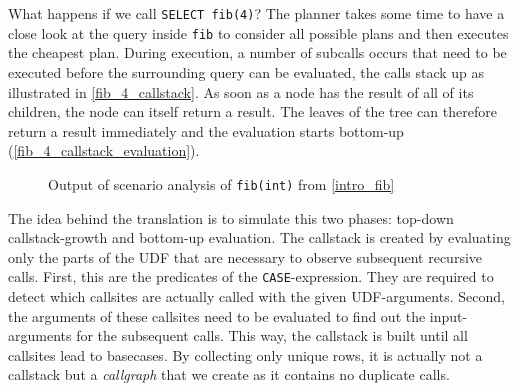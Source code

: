 What happens if we call \texttt{SELECT fib(4)}? The planner takes some time to have a close look at the query inside \texttt{fib} to consider all possible plans and then executes the cheapest plan. During execution, a number of subcalls occurs that need to be executed before the surrounding query can be evaluated, the calls stack up as illustrated in \autoref{fib_4_callstack}. As soon as a node has the result of all of its children, the node can itself return a result. The leaves of the tree can therefore return a result immediately and the evaluation starts bottom-up (\autoref{fib_4_callstack_evaluation}). 


\begin{figure}[h!]
    \begin{minipage}[b]{.45\linewidth}
    \centering\large
    \vspace{8mm}
    \label{intro_fib}
    \end{minipage}\hfill
    \begin{minipage}[b]{.45\linewidth}
    \centering\small
    \vspace{-8mm}
    
    \label{fib_rec_scenarios}
    \end{minipage}
    \caption{Output of scenario analysis of \texttt{fib(int)} from \autoref{intro_fib}}\label{fib_analysis_output}
\end{figure}


\begin{figure}[h]
\centering

\caption{}\label{tbl:callgraph}
\end{figure}

The idea behind the translation is to simulate this two phases: top-down callstack-growth and bottom-up evaluation. The callstack is created by evaluating only the parts of the UDF that are necessary to observe subsequent recursive calls. First, this are the predicates of the \texttt{CASE}-expression. They are required to detect which callsites are actually called with the given UDF-arguments. Second, the arguments of these callsites need to be evaluated to find out the input-arguments for the subsequent calls. This way, the callstack is built until all callsites lead to basecases. By collecting only unique rows, it is actually not a callstack but a \textit{callgraph} that we create as it contains no duplicate calls.



